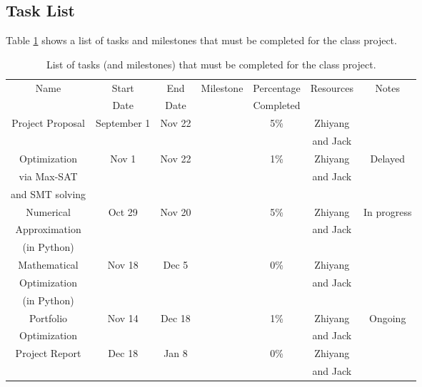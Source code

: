 \documentclass[letter,12pt]{article}
\begin{document}
\subsection{Task List}
\label{ssec:tasklist}

Table \ref{tab:tasklisttable} shows a list of tasks and milestones that must be completed for the class project.


\begin{table}%
\caption{List of tasks (and milestones) that must be completed for the class project.}
\begin{center}
	\begin{tabular}[b]{|c|c|c|c|c|c|c|}\hline
	\label{tab:tasklisttable}
		Name & Start & End & Milestone & Percentage & Resources & Notes \\
		 & Date & Date &  & Completed &  &  \\
		\hline
		Project Proposal & September 1 & Nov 22 & \checkmark & 5\% & Zhiyang & \\
		 &  &  &  &  & and Jack &  \\
		 \hline
		Optimization & Nov 1 & Nov 22 & \checkmark & 1\% & Zhiyang & Delayed \\
		via Max-SAT &  &  &  &  & and Jack &  \\
		and SMT solving &  &  &  &  &  &  \\
		\hline
		Numerical & Oct 29 & Nov 20 &  & 5\% & Zhiyang & In progress \\
		Approximation &  &  &  &  & and Jack &  \\
		(in Python) &  &  &  &  &  &  \\
		\hline
		Mathematical & Nov 18 & Dec 5 & \checkmark & 0\% & Zhiyang &  \\
		Optimization &  &  &  &  & and Jack &  \\
		(in Python) &  &  &  &  &  &  \\
		\hline
		Portfolio & Nov 14 & Dec 18 & \checkmark & 1\% & Zhiyang & Ongoing \\
		Optimization &  &  &  &  & and Jack &  \\
		\hline
		Project Report & Dec 18 & Jan 8 & \checkmark & 0\% & Zhiyang & \\
		 &  &  &  &  & and Jack &  \\
	\hline
	\end{tabular}
\end{center}
\end{table}
\end{document}
